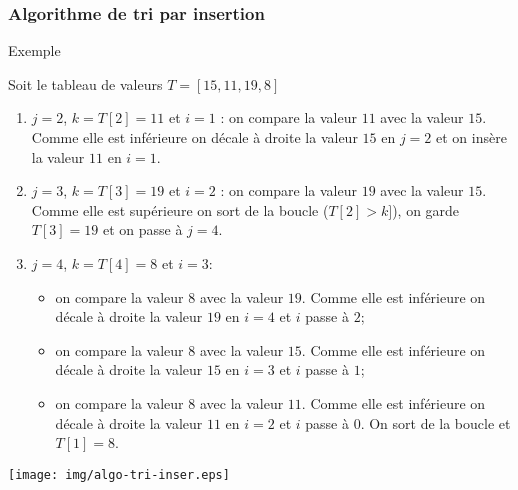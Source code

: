 \documentclass[9pt]{beamer}
\newcounter{num}
\begin{document}
\begin{frame}
\frametitle{Algorithme de tri par insertion}

\begin{exampleblock}{Exemple}
\begin{minipage}{8.4cm}
Soit le tableau de valeurs $T=[15,11,19,8]$
\begin{enumerate}
\item $j=2$, $k=T[2]=11$ et $i=1$ : on compare la valeur $11$ avec la valeur $15$. Comme elle est inférieure on décale à droite la valeur $15$ en $j=2$ et on insère la valeur $11$ en $i=1$.
\item $j=3$, $k=T[3]=19$ et $i=2$ : on compare la valeur $19$ avec la valeur $15$. Comme elle est supérieure on sort de la boucle ($T[2]>k]$), on garde $T[3]=19$ et on passe à $j=4$.
\item $j=4$, $k=T[4]=8$ et $i=3$:
\begin{itemize}
\item on compare la valeur $8$ avec la valeur $19$. Comme elle est inférieure on décale à droite la valeur $19$ en $i=4$ et $i$ passe à $2$;
\item on compare la valeur $8$ avec la valeur $15$. Comme elle est inférieure on décale à droite la valeur $15$ en $i=3$ et $i$ passe à $1$;
\item on compare la valeur $8$ avec la valeur $11$. Comme elle est inférieure on décale à droite la valeur $11$ en $i=2$ et $i$ passe à $0$. On sort de la boucle et $T[1]=8$.
\end{itemize}
\end{enumerate}
\end{minipage}\hfill
\begin{minipage}{3.4cm}
\texttt{[image: img/algo-tri-inser.eps]}
\end{minipage}
\end{exampleblock}
\end{frame}
\end{document}
